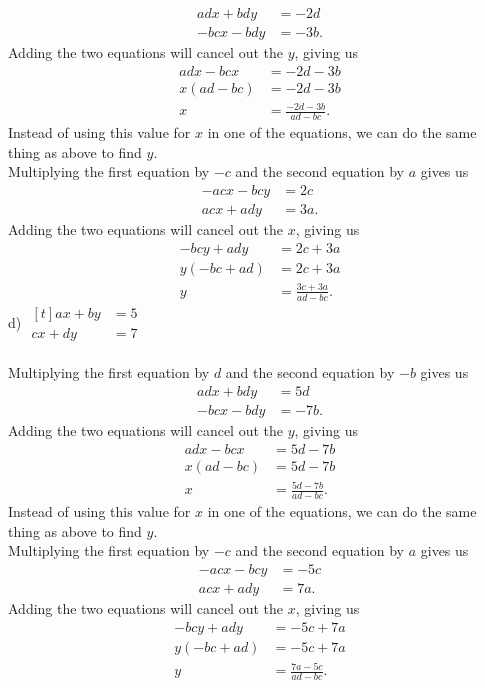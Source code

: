 \documentclass[12pt]{article}
\begin{document}
\begin{align*}
adx+bdy&=-2d \\
-bcx-bdy&=-3b.
\end{align*}
Adding the two equations will cancel out the $y$, giving us
\begin{align*}
adx-bcx&=-2d-3b \\
x(ad-bc)&=-2d-3b \\
x&=\displaystyle \frac{-2d-3b}{ad-bc}.
\end{align*}
Instead of using this value for $x$ in one of the equations, we can do the same thing as above to find $y$. \\
Multiplying the first equation by $-c$ and the second equation by $a$ gives us
\begin{align*}
-acx-bcy&=2c \\
acx+ady&=3a.
\end{align*}
Adding the two equations will cancel out the $x$, giving us
\begin{align*}
-bcy+ady&=2c+3a \\
y(-bc+ad)&=2c+3a \\
y&=\displaystyle \frac{3c+3a}{ad-bc}.
\end{align*}
d) $\begin{aligned}[t]
ax+by&=5 \\
cx+dy&=7
\end{aligned}$ \\
\\
Multiplying the first equation by $d$ and the second equation by $-b$ gives us
\begin{align*}
adx+bdy&=5d \\
-bcx-bdy&=-7b.
\end{align*}
Adding the two equations will cancel out the $y$, giving us
\begin{align*}
adx-bcx&=5d-7b \\
x(ad-bc)&=5d-7b \\
x&=\displaystyle \frac{5d-7b}{ad-bc}.
\end{align*}
Instead of using this value for $x$ in one of the equations, we can do the same thing as above to find $y$. \\
Multiplying the first equation by $-c$ and the second equation by $a$ gives us
\begin{align*}
-acx-bcy&=-5c \\
acx+ady&=7a.
\end{align*}
Adding the two equations will cancel out the $x$, giving us
\begin{align*}
-bcy+ady&=-5c+7a \\
y(-bc+ad)&=-5c+7a \\
y&=\displaystyle \frac{7a-5c}{ad-bc}.
\end{align*}
\end{document}
